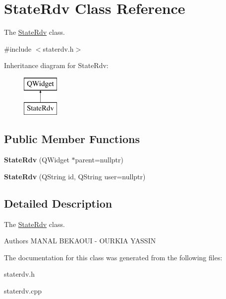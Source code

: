 \hypertarget{class_state_rdv}{}\section{State\+Rdv Class Reference}
\label{class_state_rdv}


The \mbox{\hyperlink{class_state_rdv}{State\+Rdv}} class.  




{\ttfamily \#include $<$staterdv.\+h$>$}

Inheritance diagram for State\+Rdv\+:\begin{figure}[H]
\begin{center}
\leavevmode
\includegraphics[height=2.000000cm]{class_state_rdv}
\end{center}
\end{figure}
\subsection*{Public Member Functions}
\begin{DoxyCompactItemize}
\item 
\mbox{\label{class_state_rdv_a8ef7b475b753882741f521c8c53178f7}} 
{\bfseries State\+Rdv} (Q\+Widget $\ast$parent=nullptr)
\item 
\mbox{\label{class_state_rdv_a65ba69e9e9d0a57a4f26bba8fa750aa1}} 
{\bfseries State\+Rdv} (Q\+String id, Q\+String user=nullptr)
\end{DoxyCompactItemize}


\subsection{Detailed Description}
The \mbox{\hyperlink{class_state_rdv}{State\+Rdv}} class. 

\begin{DoxyAuthor}{Authors}
M\+A\+N\+AL B\+E\+K\+A\+O\+UI -\/ O\+U\+R\+K\+IA Y\+A\+S\+S\+IN 
\end{DoxyAuthor}


The documentation for this class was generated from the following files\+:\begin{DoxyCompactItemize}
\item 
staterdv.\+h\item 
staterdv.\+cpp\end{DoxyCompactItemize}
